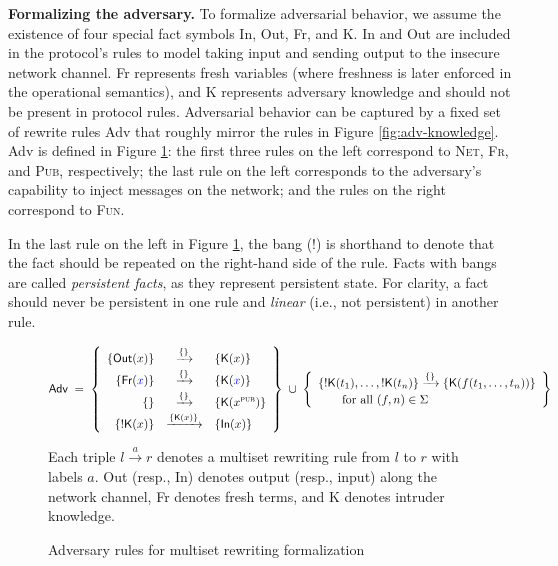 \documentclass{article}
\theoremstyle{definition}
\newcommand{\blue}[1]{\textcolor{blue}{#1}}
\begin{document}
\textbf{Formalizing the adversary.} To formalize adversarial behavior, we assume the existence of four special fact symbols \textsf{In}, \textsf{Out}, \textsf{Fr}, and \textsf{K}. \textsf{In} and \textsf{Out} are included in the protocol's rules to model taking input and sending output to the insecure network channel. \textsf{Fr} represents fresh variables (where freshness is later enforced in the operational semantics), and \textsf{K} represents adversary knowledge and should not be present in protocol rules.
Adversarial behavior can be captured by a fixed set of rewrite rules \textsf{Adv} that roughly mirror the rules in Figure \ref{fig:adv-knowledge}. \textsf{Adv} is defined in Figure \ref{fig:adv-rules}: the first three rules on the left correspond to \textsc{Net}, \textsc{Fr}, and \textsc{Pub}, respectively; the last rule on the left corresponds to the adversary's capability to inject messages on the network; and the rules on the right correspond to \textsc{Fun}.

In the last rule on the left in Figure \ref{fig:adv-rules}, the bang ($!$) is shorthand to denote that the fact should be repeated on the right-hand side of the rule. Facts with bangs are called \textit{persistent facts}, as they represent persistent state. For clarity, a fact should never be persistent in one rule and \textit{linear} (i.e., not persistent) in another rule.

\begin{figure}[t]
  \centering
  \[
  \textsf{Adv} \;=\;
  \left\{
  \begin{array}{rcl}
    \{ \mathsf{Out}(x) \}
      & \xrightarrow{\{\}} &
    \{ \mathsf{K}(x) \} \\[2pt]

    \{ \mathsf{Fr}(\blue{x}) \}
      & \xrightarrow{\{\}} &
    \{ \mathsf{K}(\blue{x}) \} \\[2pt]

    \{ \}
      & \xrightarrow{\{\}} &
    \{ \mathsf{K}(x^\textsc{pub}) \} \\[2pt]

    \{ !\mathsf{K}(x) \}
      & \xrightarrow{\{\mathsf{K}(x)\}} &
    \{ \mathsf{In}(x) \} 
  \end{array}
  \right\}
  \;\cup\;
  \left\{
  \begin{array}{l}
    \{ !\mathsf{K}(t_1), \dots, !\mathsf{K}(t_n) \}
      \xrightarrow{\{\}}
    \{ \mathsf{K}(f(t_1, \dots, t_n)) \} \\[2pt]
    \qquad\text{for all } (f,n) \in \Sigma
  \end{array}
  \right\}
  \]
  \begin{flushleft}
{\footnotesize
Each triple $l \xrightarrow{a} r$ denotes a multiset rewriting rule from $l$ to $r$ with labels $a$. \textsf{Out} (resp., \textsf{In}) denotes output (resp., input) along the network channel, \textsf{Fr} denotes fresh terms, and \textsf{K} denotes intruder knowledge.
}
  \end{flushleft}
  
  \caption{Adversary rules for multiset rewriting formalization}
  \label{fig:adv-rules}
\end{figure}
\end{document}
